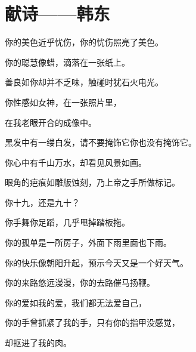 \section{献诗——韩东}
你的美色近乎忧伤，你的忧伤照亮了美色。

你的聪慧像蜡，滴落在一张纸上。

善良如你却并不乏味，触碰时犹石火电光。

你性感如女神，在一张照片里，

在我老眼开合的成像中。

黑发中有一缕白发，请不要掩饰它你也没有掩饰它。

你心中有千山万水，却看见风景如画。

眼角的疤痕如雕版蚀刻，乃上帝之手所做标记。

你十九，还是九十？

你手舞你足蹈，几乎甩掉踏板拖。

你的孤单是一所房子，外面下雨里面也下雨。

你的快乐像朝阳升起，预示今天又是一个好天气。

你的来路悠远漫漫，你的去路催马扬鞭。

你的爱如我的爱，我们都无法爱自己，

你的手曾抓紧了我的手，只有你的指甲没感觉，

却抠进了我的肉。